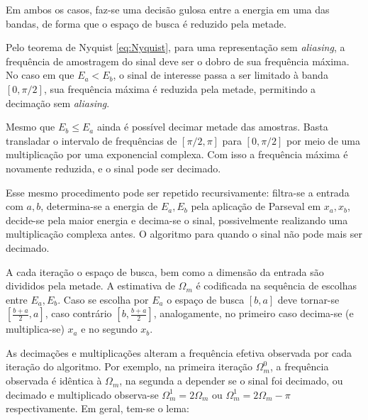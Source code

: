 Em ambos os casos, faz-se uma decisão gulosa entre a energia em uma das bandas, de forma que o espaço de busca é reduzido pela metade.

Pelo teorema de Nyquist \ref{eq:Nyquist}, para uma representação sem \textit{aliasing}, a frequência de amostragem do sinal deve ser o dobro de sua frequência máxima. No caso em que $E_a < E_b$, o sinal de interesse passa a ser limitado à banda $[0,\pi/2]$, sua frequência máxima é reduzida pela metade, permitindo a decimação sem \textit{aliasing}.

Mesmo que $E_b \leq E_a$ ainda é possível decimar metade das amostras. Basta transladar o intervalo de frequências de $[\pi/2,\pi]$ para $[0,\pi/2]$ por meio de uma multiplicação por uma exponencial complexa. Com isso a frequência máxima é novamente reduzida, e o sinal pode ser decimado.

Esse mesmo procedimento pode ser repetido recursivamente: filtra-se a entrada com $a,b$, determina-se a energia de $E_a,E_b$ pela aplicação de Parseval em $x_a,x_b$, decide-se pela maior energia e decima-se o sinal, possivelmente realizando uma multiplicação complexa antes. O algoritmo para quando o sinal não pode mais ser decimado.

A cada iteração o espaço de busca, bem como a dimensão da entrada são divididos pela metade. A estimativa de $\Omega_m$ é codificada na sequência de escolhas entre $E_a,E_b$. Caso se escolha por $E_a$ o espaço de busca $[b,a]$ deve tornar-se $[\frac{b+a}{2},a]$, caso contrário $[b,\frac{b+a}{2}]$, analogamente, no primeiro caso decima-se (e multiplica-se) $x_a$ e no segundo $x_b$.

As decimações e multiplicações alteram a frequência efetiva observada por cada iteração do algoritmo. Por exemplo, na primeira iteração $\Omega_m^0$, a frequência observada é idêntica à $\Omega_m$, na segunda a depender se o sinal foi decimado, ou decimado e multiplicado observa-se $\Omega_m^1 = 2\Omega_m$ ou $\Omega_m^1 = 2\Omega_m-\pi$ respectivamente. Em geral, tem-se o lema:

